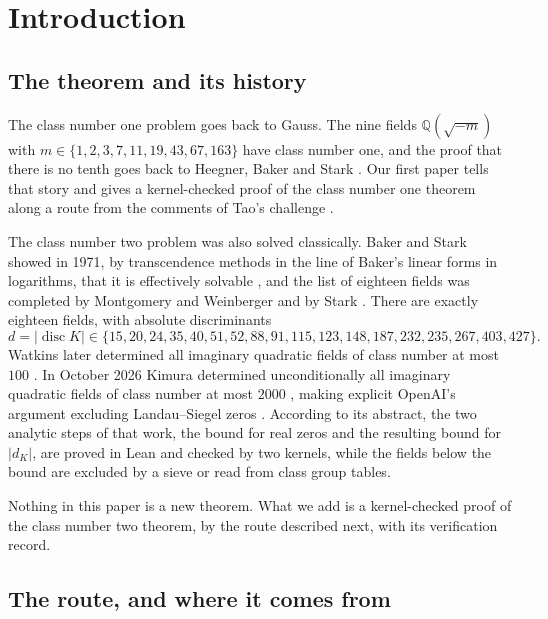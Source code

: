\documentclass[11pt]{article}
\theoremstyle{definition}
\newcommand{\Q}{\mathbb{Q}}
\newcommand{\disc}{\operatorname{disc}}
\begin{document}
\section{Introduction}

\subsection{The theorem and its history}

The class number one problem goes back to Gauss. The nine fields $\Q(\sqrt{-m})$ with $m \in \{1, 2, 3, 7, 11, 19, 43, 67, 163\}$ have class number one, and the proof that there is no tenth goes back to Heegner, Baker and Stark \cite{Heegner1952,Baker1966,Stark1967}. Our first paper \cite{CN1paper} tells that story and gives a kernel-checked proof of the class number one theorem along a route from the comments of Tao's challenge \cite{Tao2026}.

The class number two problem was also solved classically. Baker and Stark showed in 1971, by transcendence methods in the line of Baker's linear forms in logarithms, that it is effectively solvable \cite{Baker1971,Stark1971}, and the list of eighteen fields was completed by Montgomery and Weinberger \cite{MontgomeryWeinberger1974} and by Stark \cite{Stark1975}. There are exactly eighteen fields, with absolute discriminants
\[
d = |\disc K| \in \{15, 20, 24, 35, 40, 51, 52, 88, 91, 115, 123, 148, 187, 232, 235, 267, 403, 427\}.
\]
Watkins later determined all imaginary quadratic fields of class number at most $100$ \cite{Watkins2004}. In October 2026 Kimura determined unconditionally all imaginary quadratic fields of class number at most $2000$ \cite{Kimura2026}, making explicit OpenAI's argument excluding Landau--Siegel zeros \cite{OAIsiegel}. According to its abstract, the two analytic steps of that work, the bound for real zeros and the resulting bound for $|d_K|$, are proved in Lean and checked by two kernels, while the fields below the bound are excluded by a sieve or read from class group tables.

Nothing in this paper is a new theorem. What we add is a kernel-checked proof of the class number two theorem, by the route described next, with its verification record.

\subsection{The route, and where it comes from}\label{sec:credit}
\end{document}

